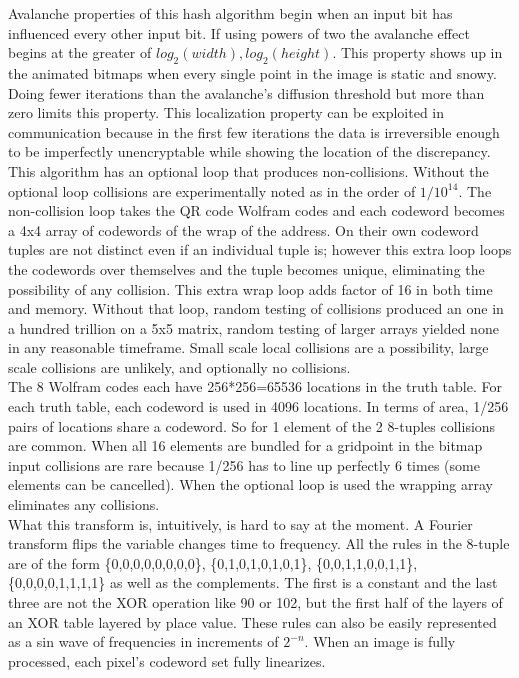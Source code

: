 \documentclass[11pt]{article}
\begin{document}
Avalanche properties of this hash algorithm begin when an input bit has influenced every other input bit. If using powers of two the avalanche effect begins at the greater of $log_2 (width) , log_2 (height)$. This property shows up in the animated bitmaps when every single point in the image is static and snowy. Doing fewer iterations than the avalanche's diffusion threshold but more than zero limits this property. This localization property can be exploited in communication because in the first few iterations the data is irreversible enough to be imperfectly unencryptable while showing the location of the discrepancy.\\

This algorithm has an optional loop that produces non-collisions. Without the optional loop collisions are experimentally noted as in the order of $1/10^14$. The non-collision loop takes the QR code Wolfram codes and each codeword becomes a 4x4 array of codewords of the wrap of the address. On their own codeword tuples are not distinct even if an individual tuple is; however this extra loop loops the codewords over themselves and the tuple becomes unique, eliminating the possibility of any collision. This extra wrap loop adds factor of 16 in both time and memory. Without that loop, random testing of collisions produced an one in a hundred trillion on a 5x5 matrix, random testing of larger arrays yielded none in any reasonable timeframe. Small scale local collisions are a possibility, large scale collisions are unlikely, and optionally no collisions.\\

The 8 Wolfram codes each have 256*256=65536 locations in the truth table. For each truth table, each codeword is used in 4096 locations. In terms of area, 1/256 pairs of locations share a codeword. So for 1 element of the 2 8-tuples collisions are common. When all 16 elements are bundled for a gridpoint in the bitmap input collisions are rare because 1/256 has to line up perfectly 6 times (some elements can be cancelled). When the optional loop is used the wrapping array eliminates any collisions.\\

What this transform is, intuitively, is hard to say at the moment. A Fourier transform flips the variable changes time to frequency. All the rules in the 8-tuple are of the form \{0,0,0,0,0,0,0,0\}, \{0,1,0,1,0,1,0,1\}, \{0,0,1,1,0,0,1,1\}, \{0,0,0,0,1,1,1,1\} as well as the complements. The first is a constant and the last three are not the XOR operation like 90 or 102, but the first half of the layers of an XOR table layered by place value. These rules can also be easily represented as a sin wave of frequencies in increments of $2^{-n}$. When an image is fully processed, each pixel's codeword set fully linearizes. 
\end{document}
